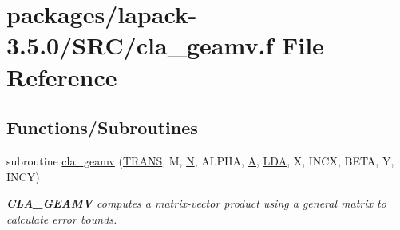 \hypertarget{cla__geamv_8f}{}\section{packages/lapack-\/3.5.0/\+S\+R\+C/cla\+\_\+geamv.f File Reference}
\label{cla__geamv_8f}
\subsection*{Functions/\+Subroutines}
\begin{DoxyCompactItemize}
\item 
subroutine \hyperlink{group__complexGEcomputational_gadf6f5ebfc2914a4e1ee2fd4cfa684f28}{cla\+\_\+geamv} (\hyperlink{superlu__enum__consts_8h_a0c4e17b2d5cea33f9991ccc6a6678d62a1f61e3015bfe0f0c2c3fda4c5a0cdf58}{T\+R\+A\+N\+S}, M, \hyperlink{polmisc_8c_a0240ac851181b84ac374872dc5434ee4}{N}, A\+L\+P\+H\+A, \hyperlink{classA}{A}, \hyperlink{example__user_8c_ae946da542ce0db94dced19b2ecefd1aa}{L\+D\+A}, X, I\+N\+C\+X, B\+E\+T\+A, Y, I\+N\+C\+Y)
\begin{DoxyCompactList}\small\item\em {\bfseries C\+L\+A\+\_\+\+G\+E\+A\+M\+V} computes a matrix-\/vector product using a general matrix to calculate error bounds. \end{DoxyCompactList}\end{DoxyCompactItemize}
